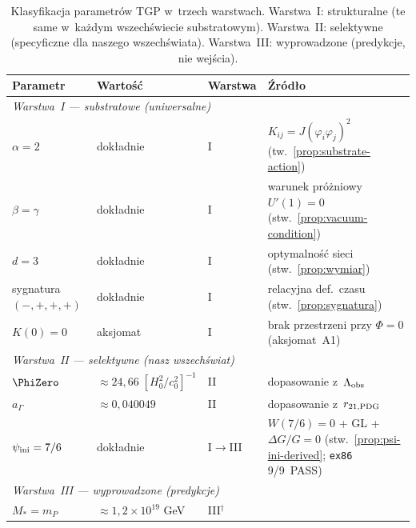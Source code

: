 \begin{table}[h!]
\centering\small
\caption{Klasyfikacja parametr\'ow TGP w~trzech warstwach.
Warstwa~I: stru\-ktu\-ral\-ne (te same w~ka\.zdym wszech\'swiecie
substratowym).
Warstwa~II: selektywne (specyficz\-ne dla naszego wszech\'swiata).
Warstwa~III: wy\-pro\-wa\-dzone (predykcje, nie wej\'scia).}
\label{tab:param-classification}
\begin{tabular}{@{}llll@{}}
\toprule
\textbf{Parametr} & \textbf{Warto\'s\'c} & \textbf{Warstwa} & \textbf{\'Zr\'od\l{}o} \\
\midrule
\multicolumn{4}{l}{\textit{Warstwa~I --- substratowe (uniwersalne)}} \\
$\alpha = 2$ & dok\l{}adnie & I & $K_{ij} = J(\varphi_i\varphi_j)^2$
  (tw.~\ref{prop:substrate-action}) \\
$\beta = \gamma$ & dok\l{}adnie & I & warunek pr\'o\.zniowy $U'(1)=0$
  (stw.~\ref{prop:vacuum-condition}) \\
$d = 3$ & dok\l{}adnie & I & optymalno\'s\'c sieci
  (stw.~\ref{prop:wymiar}) \\
sygnatura $(-,+,+,+)$ & dok\l{}adnie & I & relacyjna def.\ czasu
  (stw.~\ref{prop:sygnatura}) \\
$K(0) = 0$ & aksjomat & I & brak przestrzeni przy $\Phi = 0$
  (aksjomat~A1) \\
\midrule
\multicolumn{4}{l}{\textit{Warstwa~II --- selektywne (nasz wszech\'swiat)}} \\
$\PhiZero$ & $\approx 24{,}66\;[H_0^2/c_0^2]^{-1}$ & II &
  dopasowanie z~$\Lambda_{\rm obs}$ \\
$a_\Gamma$ & $\approx 0{,}040049$ & II &
  dopasowanie z~$r_{21,\rm PDG}$ \\
$\psi_{\rm ini} = 7/6$ & dok\l{}adnie & I$\to$III &
  $W(7/6)=0$ + GL + $\Delta G/G=0$
  (stw.~\ref{prop:psi-ini-derived}; \texttt{ex86} 9/9~PASS) \\
\midrule
\multicolumn{4}{l}{\textit{Warstwa~III --- wyprowadzone (predykcje)}} \\
$M_* = m_P$ & $\approx 1{,}2\times 10^{19}$ GeV & III$^{\dagger}$ &

\end{tabular}
\end{table}
